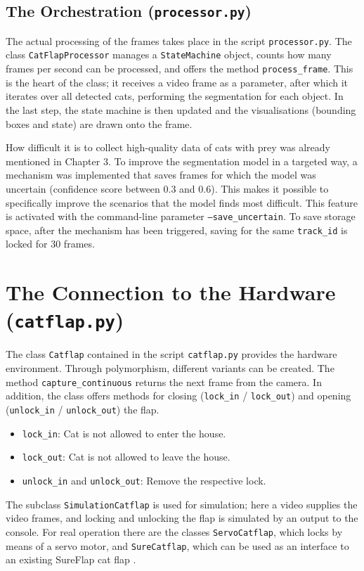 \subsection{The Orchestration (\texttt{processor.py})}
The actual processing of the frames takes place in the script \texttt{processor.py}. The class \texttt{CatFlapProcessor} manages a \texttt{StateMachine} object, counts how many frames per second can be processed, and offers the method \texttt{process\_frame}. This is the heart of the class; it receives a video frame as a parameter, after which it iterates over all detected cats, performing the segmentation for each object. In the last step, the state machine is then updated and the visualisations (bounding boxes and state) are drawn onto the frame.

How difficult it is to collect high-quality data of cats with prey was already mentioned in Chapter 3. To improve the segmentation model in a targeted way, a mechanism was implemented that saves frames for which the model was uncertain (confidence score between 0.3 and 0.6). This makes it possible to specifically improve the scenarios that the model finds most difficult. This feature is activated with the command-line parameter \texttt{--save\_uncertain}. To save storage space, after the mechanism has been triggered, saving for the same \texttt{track\_id} is locked for 30 frames.

\section{The Connection to the Hardware (\texttt{catflap.py})}
The class \texttt{Catflap} contained in the script \texttt{catflap.py} provides the hardware environment. Through polymorphism, different variants can be created. The method \texttt{capture\_continuous} returns the next frame from the camera. In addition, the class offers methods for closing (\texttt{lock\_in} / \texttt{lock\_out}) and opening (\texttt{unlock\_in} / \texttt{unlock\_out}) the flap.

\begin{itemize}
	\item \texttt{lock\_in}: Cat is not allowed to enter the house.
	\item \texttt{lock\_out}: Cat is not allowed to leave the house.
	\item \texttt{unlock\_in} and \texttt{unlock\_out}: Remove the respective lock.
\end{itemize}

The subclass \texttt{SimulationCatflap} is used for simulation; here a video supplies the video frames, and locking and unlocking the flap is simulated by an output to the console. For real operation there are the classes \texttt{ServoCatflap}, which locks by means of a servo motor, and \texttt{SureCatflap}, which can be used as an interface to an existing SureFlap cat flap \cite{surepetcare_microchip}.

